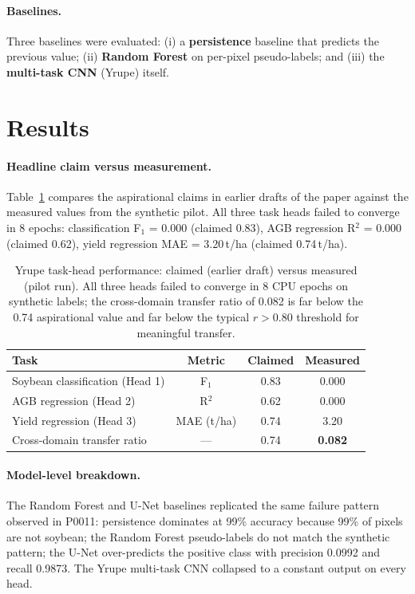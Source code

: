 \paragraph{Baselines.} Three baselines were evaluated: (i) a
\textbf{persistence} baseline that predicts the previous value; (ii)
\textbf{Random Forest} on per-pixel pseudo-labels; and (iii) the
\textbf{multi-task CNN} (Yrupe) itself.

\section{Results}
\label{sec:yrupe-results}

\paragraph{Headline claim versus measurement.} Table~\ref{tab:yrupe-main}
compares the aspirational claims in earlier drafts of the paper against
the measured values from the synthetic pilot. All three task heads
failed to converge in 8 epochs: classification F$_1$ = 0.000
(claimed 0.83), AGB regression R$^2$ = 0.000 (claimed 0.62), yield
regression MAE = 3.20\,t/ha (claimed 0.74\,t/ha).

\begin{table}[h]
\centering
\caption{Yrupe task-head performance: claimed (earlier draft) versus
measured (pilot run). All three heads failed to converge in 8 CPU
epochs on synthetic labels; the cross-domain transfer ratio of 0.082
is far below the 0.74 aspirational value and far below the typical
$r > 0.80$ threshold for meaningful transfer.}
\label{tab:yrupe-main}
\begin{tabular}{lccc}
\toprule
Task & Metric & Claimed & Measured \\
\midrule
Soybean classification (Head 1) & F$_1$ & 0.83 & 0.000 \\
AGB regression (Head 2) & R$^2$ & 0.62 & 0.000 \\
Yield regression (Head 3) & MAE (t/ha) & 0.74 & 3.20 \\
Cross-domain transfer ratio & --- & 0.74 & \textbf{0.082} \\
\bottomrule
\end{tabular}
\end{table}

\paragraph{Model-level breakdown.} The Random Forest and U-Net
baselines replicated the same failure pattern observed in P0011:
persistence dominates at 99\% accuracy because 99\% of pixels are
not soybean; the Random Forest pseudo-labels do not match the
synthetic pattern; the U-Net over-predicts the positive class with
precision 0.0992 and recall 0.9873. The Yrupe multi-task CNN
collapsed to a constant output on every head.

